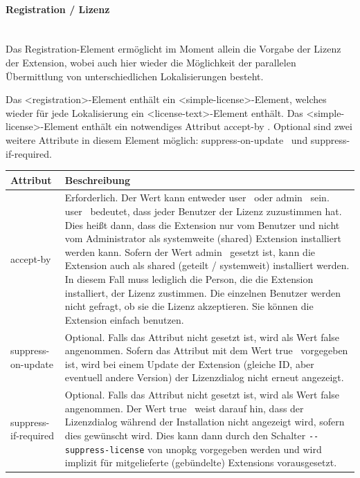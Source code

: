 \documentclass[a4paper,10pt,pagesize,titlepage]{scrbook}
\begin{document}
\paragraph*{Registration / Lizenz}$~~$\\

Das Registration-Element ermöglicht im Moment allein die Vorgabe der Lizenz der Extension, wobei auch hier wieder die Möglichkeit der parallelen Übermittlung von unterschiedlichen Lokalisierungen besteht.

Das <registration>-Element enthält ein <simple-license>-Element, welches wieder für jede Lokalisierung ein <license-text>-Element enthält. Das <simple-license>-Element enthält ein notwendiges Attribut \glqq accept-by \grqq . Optional sind zwei weitere Attribute in diesem Element möglich: \glqq suppress-on-update\grqq~ und \glqq suppress-if-required\grqq .\\

\begin{tabular}{|p{3.5cm}|p{8.3cm}|}
	\hline \rowcolor{hellgrau} \rule[-3ex]{0pt}{5.5ex}  Attribut & Beschreibung \\
	\hline \rule[-3ex]{0pt}{5.5ex} accept-by & Erforderlich. Der Wert kann entweder \glqq user\grqq~ oder \glqq admin\grqq~ sein. \glqq user\grqq~ bedeutet, dass jeder Benutzer der Lizenz zuzustimmen hat. Dies heißt dann, dass die Extension nur vom Benutzer und nicht vom Administrator als systemweite (shared) Extension installiert werden kann. Sofern der Wert \glqq admin\grqq~ gesetzt ist, kann die Extension auch als shared (geteilt / systemweit) installiert werden. In diesem Fall muss lediglich die Person, die die Extension installiert, der Lizenz zustimmen. Die einzelnen Benutzer werden nicht gefragt, ob sie die Lizenz akzeptieren. Sie können die Extension einfach benutzen.\\
	\hline \rule[-3ex]{0pt}{5.5ex}	suppress-on-update & Optional. Falls das Attribut nicht gesetzt ist, wird als Wert \glqq false\grqq~ angenommen. Sofern das Attribut mit dem Wert \glqq true\grqq~ vorgegeben ist, wird bei einem Update der Extension (gleiche ID, aber eventuell andere Version) der Lizenzdialog nicht erneut angezeigt.\\
	\hline \rule[-3ex]{0pt}{5.5ex}	suppress-if-required & Optional. Falls das Attribut nicht gesetzt ist, wird als Wert \glqq false\grqq~ angenommen. Der Wert \glqq true\grqq~ weist darauf hin, dass der Lizenzdialog während der Installation nicht angezeigt wird, sofern dies gewünscht wird. Dies kann dann durch den Schalter  \verb|--suppress-license| von unopkg vorgegeben werden und wird implizit für mitgelieferte (gebündelte) Extensions vorausgesetzt.\\
	\bottomrule
	
\end{tabular}
\end{document}
